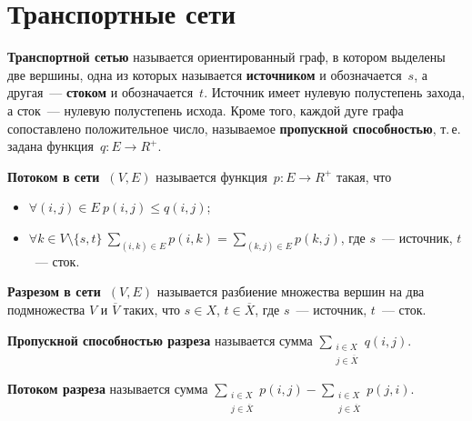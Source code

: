 \section{Транспортные сети}
   \textbf{Транспортной сетью} называется ориентированный граф, в котором выделены две вершины, одна из которых называется \textbf{источником} и обозначается~$s$, а другая~--- \textbf{стоком} и обозначается~$t$.
Источник имеет нулевую полустепень захода, а сток~--- нулевую полустепень исхода.
 Кроме того, каждой дуге графа сопоставлено положительное число, называемое \textbf{пропускной способностью}, т.\,е. задана функция~$q \colon E \to R^+$.

 \textbf{Потоком в сети~$(V, E)$} называется функция~$p \colon E \to R^+$ такая, что
\begin{itemize}
	\item $\forall (i, j) \in E \ p(i, j) \leqslant q(i, j)$;
	\item $\forall k \in V \setminus \{ s, t \} \ \sum\limits_{(i, k) \in E} p(i, k) = \sum\limits_{(k, j) \in E} p(k, j)$, где $s$~--- источник, $t$~--- сток.
\end{itemize}

 \textbf{Разрезом в сети~$(V, E)$} называется разбиение множества вершин на два подмножества $V$ и $\overline V$ таких, что $s \in X$, $t \in \overline X$, где $s$~--- источник, $t$~--- сток.

\textbf{Пропускной способностью разреза} называется сумма $\sum\limits_{\begin{smallmatrix}
i \in X \\
j \in \overline X
\end{smallmatrix}} q(i, j)$.

\textbf{Потоком разреза} называется сумма $\sum\limits_{\begin{smallmatrix}
i \in X \\
j \in \overline X
\end{smallmatrix}} p(i, j) -
\sum_{\begin{smallmatrix}
i \in X \\
j \in \overline X
\end{smallmatrix}} p(j, i)$.